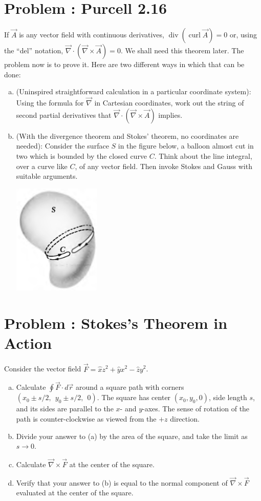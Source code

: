 \documentclass[problems]{esg8022pset}
\begin{document}
\section{Problem \thesection: Purcell 2.16}
  If $\vec A$ is any vector field with continuous derivatives, $\operatorname{div}(\operatorname{curl}\vec A) = 0$ or, using the ``del'' notation, $\vec \nabla \cdot (\vec \nabla \times \vec A) = 0$. We shall need this theorem later. The problem now is to prove it. Here are two different ways in which that can be done:
  \begin{enumerate}[(a)]
    \item (Uninspired straightforward calculation in a particular coordinate system): Using the formula for $\vec\nabla$ in Cartesian coordinates, work out the string of second partial derivatives that $\vec \nabla \cdot (\vec \nabla \times \vec A)$ implies.
    \item (With the divergence theorem and Stokes' theorem, no coordinates are needed): Consider the surface $S$ in the figure below, a balloon almost cut in two which is bounded by the closed curve $C$. Think about the line integral, over a curve like $C$, of any vector field. Then invoke Stokes and Gauss with suitable arguments.
      \begin{center}\includegraphics[width=0.33\textwidth]{ps03_02}\end{center}
  \end{enumerate}
\section{Problem \thesection: Stokes's Theorem in Action}
  Consider the vector field $\vec{F} = \hat{x} z^2 + \hat{y} x^2 - \hat{z} y^2$.
  \begin{enumerate}[(a)]
    \item Calculate $\oint \vec{F} \cdot d\vec{r}$ around a square path with
      corners $(x_0 \pm s/2,~~y_0 \pm s/2,~~0)$. The square has
      center $(x_0,y_0,0)$, side length $s$, and its sides are parallel to
      the $x$- and $y$-axes. The sense of rotation of the path
      is counter-clockwise as viewed from the $+z$ direction.
    \item Divide your answer to (a) by the area of the square, and take
      the limit as $s\rightarrow 0$.
    \item Calculate $\vec{\nabla}\times \vec{F}$ at the center of the square.
    \item Verify that your answer to (b) is equal to the normal component
      of $\vec{\nabla}\times\vec{F}$ evaluated at the center of the square.
  \end{enumerate}
\end{document}
